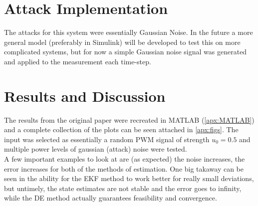 \documentclass[]{article}
\begin{document}
\section{Attack Implementation}
The attacks for this system were essentially Gaussian Noise. In the future a more general model (preferably in Simulink) will be developed to test this on more complicated systems, but for now a simple Gaussian noise signal was generated and applied to the measurement each time-step.

\section{Results and Discussion}
The results from the original paper were recreated in MATLAB (\appendixname \ref{apx:MATLAB}) and a complete collection of the plots can be seen attached in \appendixname \ref{apx:figs}. The input was selected as essentially a random PWM signal of strength $u_0 = 0.5$ and multiple power levels of gaussian (attack) noise were tested.\\
A few important examples to look at are (as expected) the noise increases, the error increases for both of the methods of estimation. One big takaway can be seen in the ability for the EKF method to work better for really small deviations, but untimely, the state estimates are not stable and the error goes to infinity, while the DE method actually guarantees feasibility and convergence.





%
%
%
\end{document}

